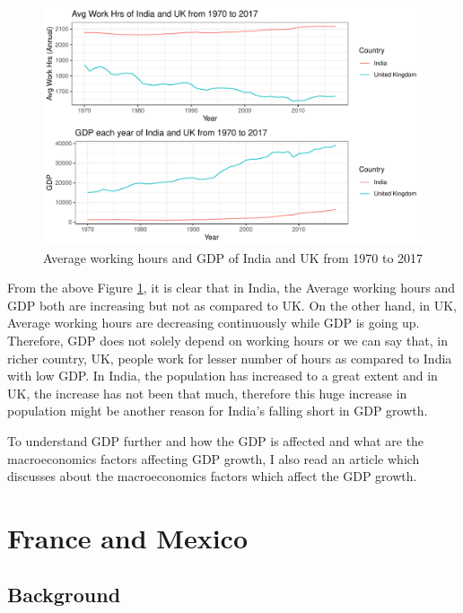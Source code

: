 \documentclass[11pt,a4paper,]{article}
\begin{document}
\begin{figure}

{\centering \includegraphics{report_files/figure-latex/FigTrend-1} 

}

\caption{Average working hours and GDP of India and UK from 1970 to 2017}\label{fig:FigTrend}
\end{figure}

From the above Figure \ref{fig:FigTrend}, it is clear that in India, the Average working hours and GDP both are increasing but not as compared to UK. On the other hand, in UK, Average working hours are decreasing continuously while GDP is going up. Therefore, GDP does not solely depend on working hours or we can say that, in richer country, UK, people work for lesser number of hours as compared to India with low GDP. In India, the population has increased to a great extent and in UK, the increase has not been that much, therefore this huge increase in population might be another reason for India's falling short in GDP growth.

To understand GDP further and how the GDP is affected and what are the macroeconomics factors affecting GDP growth, I also read an article \textcite{article2} which discusses about the macroeconomics factors which affect the GDP growth.

\clearpage

\hypertarget{france-and-mexico}{%
\section{France and Mexico}\label{france-and-mexico}}

\hypertarget{background-1}{%
\subsection{Background}\label{background-1}}
\end{document}

